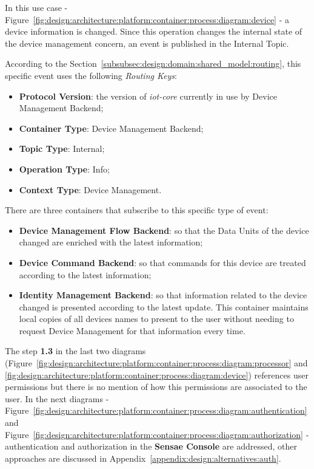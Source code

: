 In this use case - Figure~\ref{fig:design:architecture:platform:container:process:diagram:device} - a device information is changed. Since this operation changes the internal state of the device management concern, an event is published in the Internal Topic.

According to the Section~\ref{subsubsec:design:domain:shared_model:routing}, this specific event uses the following \textit{Routing Keys}:

\begin{itemize}
   \item \textbf{Protocol Version}: the version of \textit{iot-core} currently in use by Device Management Backend;
   \item \textbf{Container Type}: Device Management Backend;
   \item \textbf{Topic Type}: Internal;
   \item \textbf{Operation Type}: Info;
   \item \textbf{Context Type}: Device Management.
\end{itemize}

There are three containers that subscribe to this specific type of event:

\begin{itemize}
   \item \textbf{Device Management Flow Backend}: so that the Data Units of the device changed are enriched with the latest information;
   \item \textbf{Device Command Backend}: so that commands for this device are treated according to the latest information;
   \item \textbf{Identity Management Backend}: so that information related to the device changed is presented according to the latest update. This container maintains local copies of all devices names to present to the user without needing to request Device Management for that information every time.
\end{itemize}

The step \textbf{1.3} in the last two diagrams (Figure~\ref{fig:design:architecture:platform:container:process:diagram:processor} and \ref{fig:design:architecture:platform:container:process:diagram:device}) references user permissions but there is no mention of how this permissions are associated to the user. In the next diagrams - Figure~\ref{fig:design:architecture:platform:container:process:diagram:authentication} and Figure~\ref{fig:design:architecture:platform:container:process:diagram:authorization} - authentication and authorization in the \textbf{Sensae Console} are addressed, other approaches are discussed in Appendix~\ref{appendix:design:alternatives:auth}.

